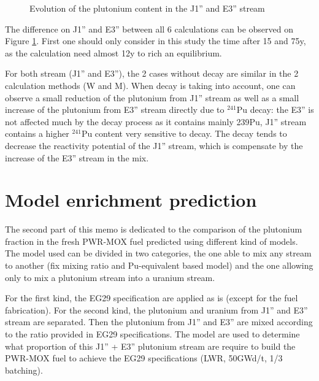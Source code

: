 \documentclass[12pt]{article}
\begin{document}
\begin{figure}[h!]
  \centering
  \caption{Evolution of the plutonium content in the J1'' and  E3'' stream\label{fig:MW_flow} }
\end{figure}

The difference on J1'' and E3'' between all 6 calculations can be observed on
Figure \ref{fig:MW_flow}. First one should only consider in this study the time
after 15 and 75y, as the calculation need almost 12y to rich an equilibrium. 

For both stream (J1'' and E3''), the 2 cases without decay are similar in the 2
calculation methods (W and M). When decay is taking into account, one can
observe a small reduction of the plutonium from  J1'' stream as well as a small
increase of the plutonium from E3'' stream directly due to $^{241}$Pu decay: the E3''
is not affected much by the decay process as it contains mainly 239Pu, J1''
stream contains a higher $^{241}$Pu content very sensitive to decay.  The decay tends
to decrease the reactivity potential of the J1'' stream, which is compensate by
the increase of the E3'' stream in the mix.


\section{Model enrichment prediction}

The second part of this memo is dedicated to the comparison of the plutonium
fraction in the fresh PWR-MOX fuel predicted using different kind of models. The
model used can be divided in two categories, the one able to mix any stream to
another (fix mixing ratio and Pu-equivalent based model) and the one allowing
only to mix a plutonium stream into a uranium stream.  

For the first kind, the EG29 specification are applied as is (except for the
fuel fabrication). For the second kind, the plutonium and uranium from J1'' and
E3'' stream are separated.  Then the plutonium from J1'' and E3'' are mixed
according to the ratio provided in EG29 specifications. The model are used to
determine what proportion of this J1'' + E3'' plutonium stream are require to
build the PWR-MOX fuel to achieve the EG29 specifications (LWR, 50GWd/t, 1/3
batching).
\end{document}
